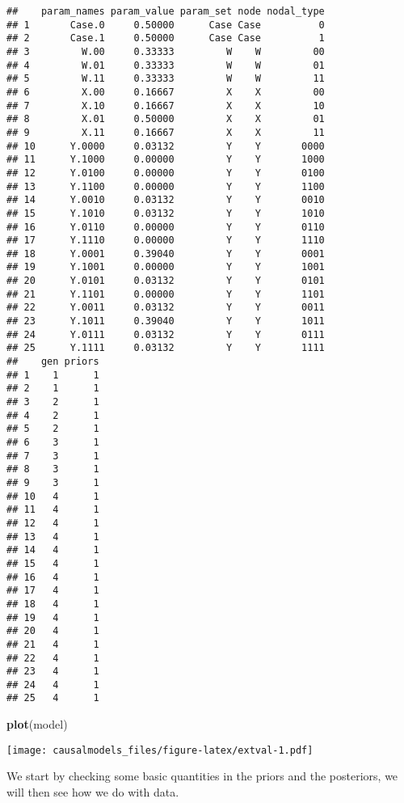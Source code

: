 \documentclass[
  12pt,
]{book}
\newenvironment{Shaded}{\begin{snugshade}}{\end{snugshade}}
\newcommand{\KeywordTok}[1]{\textcolor[rgb]{0.13,0.29,0.53}{\textbf{#1}}}
\newcommand{\NormalTok}[1]{#1}
\begin{document}
\begin{verbatim}
##    param_names param_value param_set node nodal_type
## 1       Case.0     0.50000      Case Case          0
## 2       Case.1     0.50000      Case Case          1
## 3         W.00     0.33333         W    W         00
## 4         W.01     0.33333         W    W         01
## 5         W.11     0.33333         W    W         11
## 6         X.00     0.16667         X    X         00
## 7         X.10     0.16667         X    X         10
## 8         X.01     0.50000         X    X         01
## 9         X.11     0.16667         X    X         11
## 10      Y.0000     0.03132         Y    Y       0000
## 11      Y.1000     0.00000         Y    Y       1000
## 12      Y.0100     0.00000         Y    Y       0100
## 13      Y.1100     0.00000         Y    Y       1100
## 14      Y.0010     0.03132         Y    Y       0010
## 15      Y.1010     0.03132         Y    Y       1010
## 16      Y.0110     0.00000         Y    Y       0110
## 17      Y.1110     0.00000         Y    Y       1110
## 18      Y.0001     0.39040         Y    Y       0001
## 19      Y.1001     0.00000         Y    Y       1001
## 20      Y.0101     0.03132         Y    Y       0101
## 21      Y.1101     0.00000         Y    Y       1101
## 22      Y.0011     0.03132         Y    Y       0011
## 23      Y.1011     0.39040         Y    Y       1011
## 24      Y.0111     0.03132         Y    Y       0111
## 25      Y.1111     0.03132         Y    Y       1111
##    gen priors
## 1    1      1
## 2    1      1
## 3    2      1
## 4    2      1
## 5    2      1
## 6    3      1
## 7    3      1
## 8    3      1
## 9    3      1
## 10   4      1
## 11   4      1
## 12   4      1
## 13   4      1
## 14   4      1
## 15   4      1
## 16   4      1
## 17   4      1
## 18   4      1
## 19   4      1
## 20   4      1
## 21   4      1
## 22   4      1
## 23   4      1
## 24   4      1
## 25   4      1
\end{verbatim}

\begin{Shaded}
\begin{Highlighting}[]
\KeywordTok{plot}\NormalTok{(model)}
\end{Highlighting}
\end{Shaded}

\texttt{[image: causalmodels\_files/figure-latex/extval-1.pdf]}

We start by checking some basic quantities in the priors and the posteriors, we will then see how we do with data.
\end{document}
